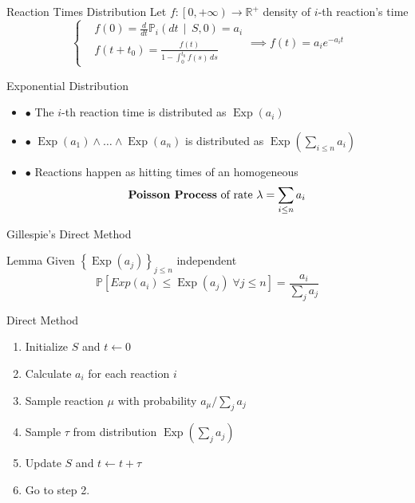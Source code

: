 \documentclass{beamer}
\DeclareMathOperator{\Exp}{\text{Exp}}
\begin{document}
\begin{frame}{Reaction Times Distribution}
  Let $f:\left[0, +\infty\right) \longrightarrow \mathbb{R}^+$ density of $i$-th reaction's time 
  \begin{equation*}
    \left\{
    \begin{aligned}
      &f(0) = \frac{d}{dt} \mathbb{P}_i \left(dt \, \middle| \, S, 0 \right)= a_i\\
      &f(t + t_0) = \frac{f(t)}{1 - \int_0^{t_0} f(s)\, ds}         
    \end{aligned}\right.
    \implies f(t) =  a_i e^{-a_i t}
  \end{equation*}
  \begin{block}{Exponential Distribution}
    \begin{itemize}
    \item $\bullet$ The $i$-th reaction time is distributed as $\Exp(a_i)$
    \item $\bullet$ $\Exp(a_1) \land \dots \land \Exp(a_n)$ is distributed as
      $\Exp\left(\sum_{i\leq n} a_i\right)$ 
    \item $\bullet$ Reactions happen as hitting times of an homogeneous 
      $$\text{\textbf{Poisson Process} of rate } \lambda =  \sum_{i\leq n} a_i$$ 
    \end{itemize}
  \end{block}
\end{frame}

\begin{frame}{Gillespie's Direct Method}
  \begin{block}{Lemma}
    Given $\left\{\Exp(a_j)\right\}_{j\leq n}$ independent 
    \begin{equation*}
      \mathbb{P}\left[Exp(a_i) \leq \Exp(a_j) \; \forall j \leq n \right] = \frac{a_i}{\sum_ja_j}
    \end{equation*}
  \end{block}
  \begin{block}{Direct Method}
    \begin{enumerate}
    \item Initialize $S$ and $t\leftarrow 0$ 
    \item Calculate $a_i$ for each reaction $i$
    \item Sample reaction $\mu$ with probability $a_\mu \big/ \sum_j a_j$
    \item Sample $\tau$ from distribution $\Exp\left(\sum_j a_j\right)$
    \item Update $S$ and $t \leftarrow t + \tau$
    \item Go to step 2.
    \end{enumerate}
  \end{block}
\end{frame}
\end{document}
